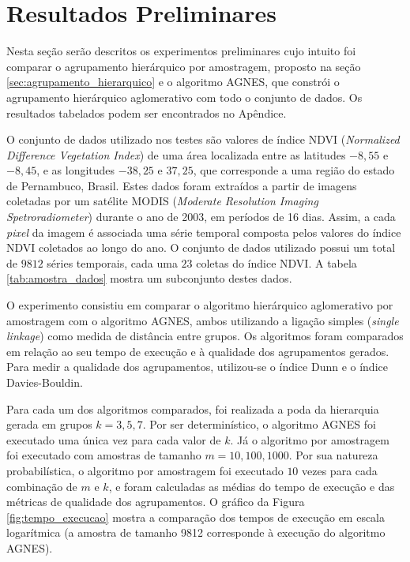 \section{Resultados Preliminares}
	\label{sec:resultados_preliminares}

Nesta seção serão descritos os experimentos preliminares cujo intuito foi
comparar o agrupamento hierárquico por amostragem, proposto na seção
\ref{sec:agrupamento_hierarquico} e o algoritmo AGNES, que constrói o
agrupamento hierárquico aglomerativo com todo o conjunto de dados. Os resultados
tabelados podem ser encontrados no Apêndice.

O conjunto de dados utilizado nos testes são valores de índice NDVI
(\emph{Normalized Difference Vegetation Index}) de uma área localizada entre
as latitudes $-8,55$ e $-8,45$, e as longitudes $-38,25$ e $37,25$, que 
corresponde a uma região do estado de Pernambuco, Brasil. Estes dados foram
extraídos a partir de imagens coletadas por um satélite MODIS
(\emph{Moderate Resolution Imaging Spetroradiometer}) durante o ano de 2003,
em períodos de 16 dias. Assim, a cada \emph{pixel} da imagem é associada uma
série temporal composta pelos valores do índice NDVI coletados ao longo do ano.
O conjunto de dados utilizado possui um total de $9812$ séries temporais, cada
uma $23$ coletas do índice NDVI. A tabela \ref{tab:amostra_dados} mostra um
subconjunto destes dados.



O experimento consistiu em comparar o algoritmo hierárquico aglomerativo por
amostragem com o algoritmo AGNES, ambos utilizando a ligação simples
(\emph{single linkage}) como medida de distância entre grupos. Os algoritmos
foram comparados em relação ao seu tempo de execução e à qualidade dos
agrupamentos gerados. Para medir a qualidade dos agrupamentos, utilizou-se
o índice Dunn e o índice Davies-Bouldin.

Para cada um dos algoritmos comparados, foi realizada a poda da hierarquia
gerada em grupos $k = 3,5,7$. Por ser determinístico, o algoritmo AGNES foi
executado uma única vez para cada valor de $k$. Já o algoritmo por amostragem
foi executado com amostras de tamanho $m = 10,100,1000$. Por sua natureza 
probabilística, o algoritmo por amostragem foi executado $10$ vezes para cada
combinação de $m$ e $k$, e foram calculadas as médias do tempo de execução
e das métricas de qualidade dos agrupamentos. O gráfico da Figura 
\ref{fig:tempo_execucao} mostra a comparação dos tempos de execução em escala
logarítmica (a amostra de tamanho 9812 corresponde à execução do algoritmo
AGNES).

